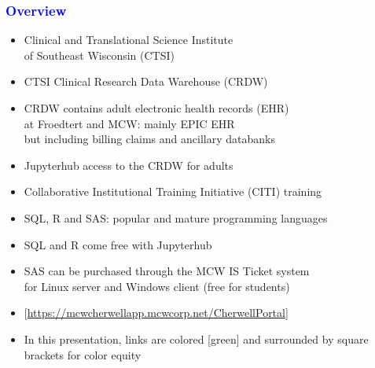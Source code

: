 \documentclass[11pt,pdftex,dvipsnames,usenames]{beamer}
\begin{document}
\begin{frame}[fragile]\frametitle{\bf\textcolor{blue}{Overview}}

\begin{itemize}
\item Clinical and Translational Science Institute\\
of Southeast Wisconsin (CTSI)
\item CTSI Clinical Research Data Warehouse (CRDW)
\item CRDW contains adult electronic health records (EHR)\\
at Froedtert and MCW: mainly EPIC EHR\\
but including billing claims and ancillary databanks
\item Jupyterhub access to the CRDW for adults
\item Collaborative Institutional Training Initiative (CITI) training
\item SQL, R and SAS: popular and mature programming languages
\item SQL and R come free with Jupyterhub
\item SAS can be purchased through the MCW IS Ticket system\\
 for Linux server and Windows client (free for students)  
\item \textcolor{PineGreen}{[\href{https://mcwcherwellapp.mcwcorp.net/CherwellPortal}{https://mcwcherwellapp.mcwcorp.net/CherwellPortal}]}
\item In this presentation, links are colored \textcolor{PineGreen}{[green]}
and surrounded by square brackets for color equity

\end{itemize}

\end{frame}
\end{document}
